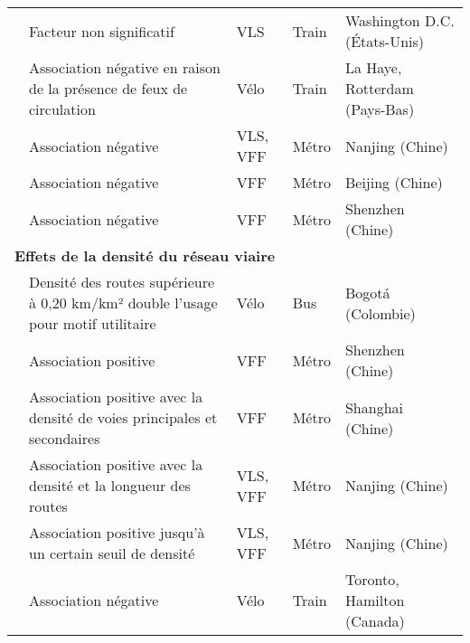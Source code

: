 \begin{longtable}{p{3cm}p{4cm}p{1.5cm}p{1.8cm}p{2.3cm}}
    \small{\textcite{ma_bicycle_2015}}\index{Ma, Ting|pagebf} & \small{Facteur non significatif} & \small{VLS} & \small{Train} & \small{Washington D.C. (États-Unis)}\\
    \small{\textcite{la_paix_puello_role_2021}}\index{La Paix Puello, Lissy|pagebf} & \small{Association négative en raison de la présence de feux de circulation} & \small{Vélo} & \small{Train} & \small{La Haye, Rotterdam (Pays-Bas)}\\
    \small{\textcite{cheng_comparison_2023}}\index{Cheng, Long|pagebf} & \small{Association négative} & \small{VLS, VFF} & \small{Métro} & \small{Nanjing (Chine)}\\
    \small{\textcite{ni_exploring_2020}}\index{Ni, Ying|pagebf} & \small{Association négative} & \small{VFF} & \small{Métro} & \small{Beijing (Chine)}\\
    \small{\textcite{guo_built_2020}}\index{Guo, Yuanyuan|pagebf} & \small{Association négative} & \small{VFF} & \small{Métro} & \small{Shenzhen (Chine)}\\
        \hline
\multicolumn{5}{l}{\textbf{Effets de la densité du réseau viaire}}\\
    \small{\textcite{cervero_influences_2009}}\index{Cervero, Robert|pagebf} & \small{Densité des routes supérieure à 0,20 km/km² double l'\gls{usage} pour motif utilitaire} & \small{Vélo} & \small{Bus} & \small{Bogotá (Colombie)}\\
    \small{\textcite{wu_measuring_2019}}\index{Wu, Xueying|pagebf} & \small{Association positive} & \small{VFF} & \small{Métro} & \small{Shenzhen (Chine)}\\
    \small{\textcite{hu_examining_2022}}\index{Hu, Songhua|pagebf} & \small{Association positive avec la densité de voies principales et secondaires} & \small{VFF} & \small{Métro} & \small{Shanghai (Chine)}\\
    \small{\textcite{chen_what_2022}}\index{Chen, Wendong|pagebf} & \small{Association positive avec la densité et la longueur des routes} & \small{VLS, VFF} & \small{Métro} & \small{Nanjing (Chine)}\\
    \small{\textcite{cheng_comparison_2023}}\index{Cheng, Long|pagebf} & \small{Association positive jusqu'à un certain seuil de densité} & \small{VLS, VFF} & \small{Métro} & \small{Nanjing (Chine)}\\
    \small{\textcite{chan_factors_2020}}\index{Chan, Kevin|pagebf} & \small{Association négative} & \small{Vélo} & \small{Train} & \small{Toronto, Hamilton (Canada)}\\

\end{longtable}
